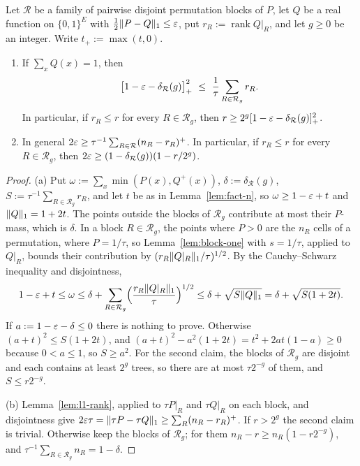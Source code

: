 \begin{theorem}\label{thm:block-approx}
Let $\mathcal R$ be a family of pairwise disjoint permutation blocks of $P$, let $Q$ be a real function on $\{0,1\}^E$ with $\frac12\lVert P-Q\rVert_1\le\varepsilon$, put $r_R:=\operatorname{rank}Q|_R$, and let $g\ge0$ be an integer. Write $t_+:=\max(t,0)$.
\begin{enumerate}[label=(\alph*)]
\item If $\sum_xQ(x)=1$, then
\[
  \bigl[1-\varepsilon-\delta_{\mathcal R}(g)\bigr]_+^2\ \le\ \frac1\tau\sum_{R\in\mathcal R_g}r_R .
\]
In particular, if $r_R\le r$ for every $R\in\mathcal R_g$, then $r\ge2^g[1-\varepsilon-\delta_{\mathcal R}(g)]_+^2$.
\item In general $2\varepsilon\ge\tau^{-1}\sum_{R\in\mathcal R}(n_R-r_R)^+$. In particular, if $r_R\le r$ for every $R\in\mathcal R_g$, then $2\varepsilon\ge(1-\delta_{\mathcal R}(g))(1-r/2^g)$.
\end{enumerate}
\end{theorem}

\begin{proof}
(a) Put $\omega:=\sum_x\min(P(x),Q^+(x))$, $\delta:=\delta_{\mathcal R}(g)$, $S:=\tau^{-1}\sum_{R\in\mathcal R_g}r_R$, and let $t$ be as in Lemma~\ref{lem:fact-n}, so $\omega\ge1-\varepsilon+t$ and $\lVert Q\rVert_1=1+2t$. The points outside the blocks of $\mathcal R_g$ contribute at most their $P$-mass, which is $\delta$. In a block $R\in\mathcal R_g$, the points where $P>0$ are the $n_R$ cells of a permutation, where $P=1/\tau$, so Lemma~\ref{lem:block-one} with $s=1/\tau$, applied to $Q|_R$, bounds their contribution by $(r_R\lVert Q|_R\rVert_1/\tau)^{1/2}$. By the Cauchy--Schwarz inequality and disjointness,
\[
  1-\varepsilon+t\le\omega\le\delta+\sum_{R\in\mathcal R_g}\Bigl(\frac{r_R\lVert Q|_R\rVert_1}\tau\Bigr)^{1/2}\le\delta+\sqrt{S\lVert Q\rVert_1}=\delta+\sqrt{S(1+2t)} .
\]
If $a:=1-\varepsilon-\delta\le0$ there is nothing to prove. Otherwise $(a+t)^2\le S(1+2t)$, and $(a+t)^2-a^2(1+2t)=t^2+2at(1-a)\ge0$ because $0<a\le1$, so $S\ge a^2$. For the second claim, the blocks of $\mathcal R_g$ are disjoint and each contains at least $2^g$ trees, so there are at most $\tau2^{-g}$ of them, and $S\le r2^{-g}$.

(b) Lemma~\ref{lem:l1-rank}, applied to $\tau P|_R$ and $\tau Q|_R$ on each block, and disjointness give $2\varepsilon\tau=\lVert \tau P-\tau Q\rVert_1\ge\sum_R(n_R-r_R)^+$. If $r>2^g$ the second claim is trivial. Otherwise keep the blocks of $\mathcal R_g$; for them $n_R-r\ge n_R(1-r2^{-g})$, and $\tau^{-1}\sum_{R\in\mathcal R_g}n_R=1-\delta$.
\end{proof}

